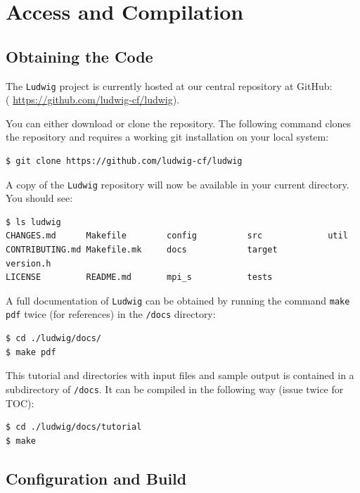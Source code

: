 \documentclass[11pt,twoside,a4paper]{article}
\begin{document}
\section{Access and Compilation}

\subsection{Obtaining the Code}
\label{sec:getCode}

The \texttt{Ludwig} project is currently hosted at our central repository at GitHub:\\
({\color{blue} \hyperref[GitHubLudwig]{https://github.com/ludwig-cf/ludwig}}).
\smallskip

You can either download or clone the repository. 
The following command clones the repository and requires a working 
git installation on your local system:

\begin{lstlisting}[style=terminalverbatim]
$ git clone https://github.com/ludwig-cf/ludwig
\end{lstlisting}

A copy of the \texttt{Ludwig} repository will now be available in your current directory. 
You should see:

\begin{lstlisting}
$ ls ludwig
CHANGES.md      Makefile        config          src             util
CONTRIBUTING.md Makefile.mk     docs            target          version.h
LICENSE         README.md       mpi_s           tests
\end{lstlisting}

A full documentation of \texttt{Ludwig} can be obtained by running 
the command \texttt{make pdf} twice (for references) in the \texttt{/docs} directory:

\begin{lstlisting}[style=terminalverbatim]
$ cd ./ludwig/docs/
$ make pdf
\end{lstlisting}

This tutorial and directories with input files and sample output is contained in 
a subdirectory of \texttt{/docs}. It can be compiled in the following way (issue twice for TOC):

\begin{lstlisting}[style=terminalverbatim]
$ cd ./ludwig/docs/tutorial
$ make
\end{lstlisting}

\subsection{Configuration and Build}\label{configbuild}
\end{document}
